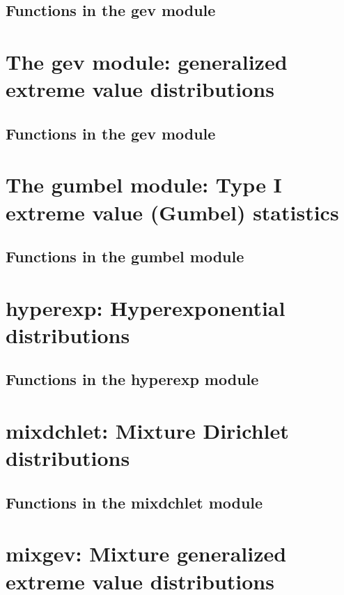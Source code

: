 \documentclass[11pt]{book}
\begin{document}
\subsection{Functions in the gev module}


\newpage
\section{The gev module: generalized extreme value distributions}

\subsection{Functions in the gev module}


\newpage
\section{The gumbel module: Type I extreme value (Gumbel) statistics}

\subsection{Functions in the gumbel module}


\newpage
\section{hyperexp: Hyperexponential distributions}

\subsection{Functions in the hyperexp module}


\newpage
\section{mixdchlet: Mixture Dirichlet distributions}
%
\subsection{Functions in the mixdchlet module}
%

\newpage
\section{mixgev: Mixture generalized extreme value distributions}
%
\end{document}
